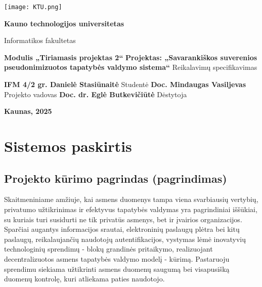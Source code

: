 \documentclass[12pt]{article}
\begin{document}

\begin{titlepage}
\vskip 20pt
\begin{center}
\texttt{[image: KTU.png]}
\end{center}


\vskip 20pt
\centerline{\bf \large \textbf{Kauno technologijos universitetas}}
\bigskip
\centerline{\large {Informatikos fakultetas}}
\bigskip

\vskip 90pt
\begin{center}
    {\bf \LARGE Modulis „Tiriamasis projektas 2“}
    \vskip 10pt
    {\bf \Large Projektas: „Savarankiškos suverenios pseudonimizuotos tapatybės 
    valdymo sistema“}
    \vskip 15pt
    {\large Reikalavimų specifikavimas}
\end{center}

\vskip 40pt

\hskip 200pt {\bf \large IFM 4/2 gr. Danielė Stasiūnaitė}
\vskip 1pt
\hskip 200pt {\large Studentė}
\vskip 7pt
\hskip 200pt {\bf \large Doc. Mindaugas Vasiljevas}
\vskip 1pt
\hskip 200pt {\large Projekto vadovas}
\vskip 7pt
\hskip 200pt {\bf \large Doc. dr. Eglė Butkevičiūtė}
\vskip 1pt
\hskip 200pt {\large Dėstytoja}

\bigskip

\vskip 100pt
\centerline{\large \textbf{Kaunas, 2025}}
\newpage
\end{titlepage}



\tableofcontents
\newpage

\section{Sistemos paskirtis}
\subsection{Projekto kūrimo pagrindas (pagrindimas)}
Skaitmeniniame amžiuje, kai asmens duomenys tampa viena svarbiausių vertybių,
privatumo užtikrinimas ir efektyvus tapatybės valdymas yra pagrindiniai
iššūkiai, su kuriais turi susidurti ne tik privatūs asmenys, bet ir įvairios
organizacijos. Sparčiai augantys informacijos srautai, elektroninių paslaugų
plėtra bei kitų paslaugų, reikalaujančių naudotojų autentifikacijos, vystymas
lėmė inovatyvių technologinių sprendimų - blokų grandinės pritaikymo, 
realizuojant decentralizuotos asmens tapatybės valdymo modelį - kūrimą.
Pastaruoju sprendimu siekiama užtikrinti asmens duomenų saugumą bei visapusišką
duomenų kontrolę, kuri atliekama paties naudotojo.
\end{document}
